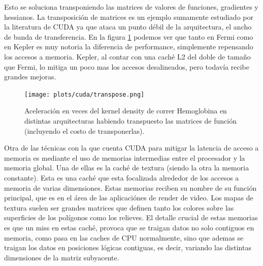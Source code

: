 Esto se soluciona transponiendo las matrices de valores de funciones, gradientes y hessianos.
La transposici\'on de matrices es un ejemplo sumamente estudiado por la literatura de CUDA
ya que ataca un punto d\'ebil de la arquitectura, el ancho de banda de transferencia. En la figura
\ref{plt:transpose} podemos ver que tanto en Fermi como en Kepler es muy notoria la diferencia
de performance, simplemente repensando los accesos a memoria. Kepler, al contar con una cach\'e L2
del doble de tama\~no que Fermi, lo mitiga un poco mas los accesos desalineados, pero todav\'ia recibe
grandes mejoras.


\begin{figure}[htbp]
   \centering
   \texttt{[image: plots/cuda/transpose.png]}
   \caption{Aceleraci\'on en veces del kernel density de correr Hemoglobina en distintas arquitecturas habiendo transpuesto las matrices
   de funci\'on (incluyendo el costo de transponerlas).}
   \label{plt:transpose}
\end{figure}

Otra de las t\'ecnicas con la que cuenta CUDA para mitigar la latencia de acceso a memoria
es mediante el uso de memorias intermedias entre el procesador y la memoria global. Una de ellas es
la cach\'e de textura (siendo la otra la memoria constante). Esta es una cach\'e que
esta focalizada alrededor de los accesos a memoria de varias dimensiones.
Estas memorias reciben su nombre de su funci\'on principal, que es en el \'area de las
aplicaci\'ones de render de video. Los mapas de textura suelen ser grandes matrices que definen
tanto los colores sobre las superficies de los pol\'igonos como los relieves.
El detalle crucial de estas memorias es que un miss en estas cach\'e, provoca
que se traigan datos no solo contiguos en memoria, como pasa en las caches de
CPU normalmente, sino que ademas se traigan los datos en posiciones l\'ogicas contiguas,
es decir, variando las distintas dimensiones de la matriz subyacente.

